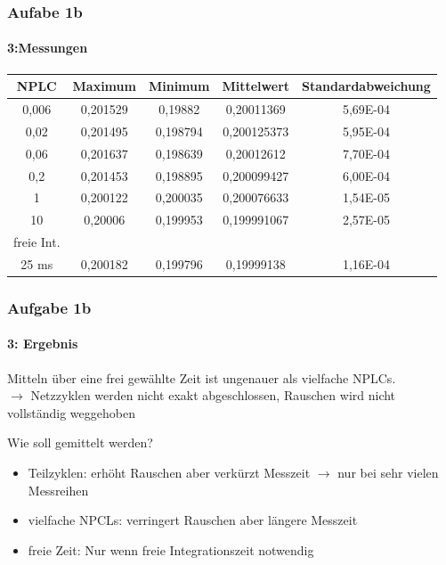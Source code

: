 \begin{frame}
\frametitle{Aufabe 1b}
\framesubtitle{3:Messungen}
\begin{tabular}{c|c c c c}
    NPLC   & Maximum    & Minimum    & Mittelwert  &Standardabweichung \\
    \hline
    0,006  & 0,201529   & 0,19882    & 0,20011369  &5,69E-04\\
    0,02   & 0,201495   & 0,198794   & 0,200125373 &5,95E-04\\
    0,06   & 0,201637   & 0,198639   & 0,20012612  &7,70E-04\\
    0,2    & 0,201453   & 0,198895   & 0,200099427 &6,00E-04\\
    1      & 0,200122   & 0,200035   & 0,200076633 &1,54E-05\\
    10     & 0,20006    & 0,199953   & 0,199991067 &2,57E-05\\
    \hline
    freie Int.& & & &\\
    \hline
    25 ms  & 0,200182   & 0,199796   & 0,19999138  &1,16E-04
\end{tabular}
\end{frame}
\begin{frame}
\frametitle{Aufgabe 1b}
\framesubtitle{3: Ergebnis} 
    Mitteln über eine frei gewählte Zeit ist ungenauer als vielfache NPLCs. \\
    $\rightarrow$ Netzzyklen werden nicht exakt abgeschlossen, Rauschen wird
    nicht vollständig weggehoben

    Wie soll gemittelt werden?
    \begin{itemize}
        \item Teilzyklen: erhöht Rauschen aber verkürzt Messzeit $\rightarrow$
        nur bei sehr vielen Messreihen
        \item vielfache NPCLs: verringert Rauschen aber längere Messzeit
        \item freie Zeit: Nur wenn freie Integrationszeit notwendig
    \end{itemize}
\end{frame}



